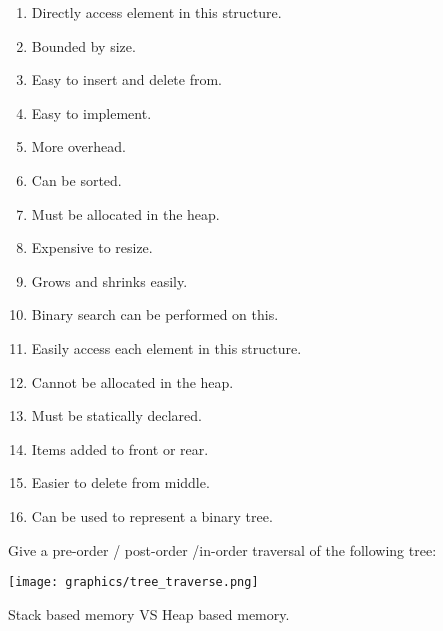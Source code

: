 \documentclass[12pt]{exam}
\begin{document}
\begin{questions}
    \renewcommand{\theenumi}{\Alph{enumi}}
    \begin{enumerate}
        \item Directly access element in this structure.
        \item Bounded by size.
        \item Easy to insert and delete from.
        \item Easy to implement.
        \item More overhead.
        \item Can be sorted.
        \item Must be allocated in the heap.
        \item Expensive to resize.
        \item Grows and shrinks easily.
        \item Binary search can be performed on this.
        \item Easily access each element in this structure.
        \item Cannot be allocated in the heap.
        \item Must be statically declared.
        \item Items added to front or rear.
        \item Easier to delete from middle.
        \item Can be used to represent a binary tree.
    \end{enumerate}


    \question[15] Give a pre-order / post-order /in-order traversal of the following tree:

    \texttt{[image: graphics/tree\_traverse.png]}

    \question  Stack based memory VS Heap based memory.

    \question
\end{questions}
\end{document}
